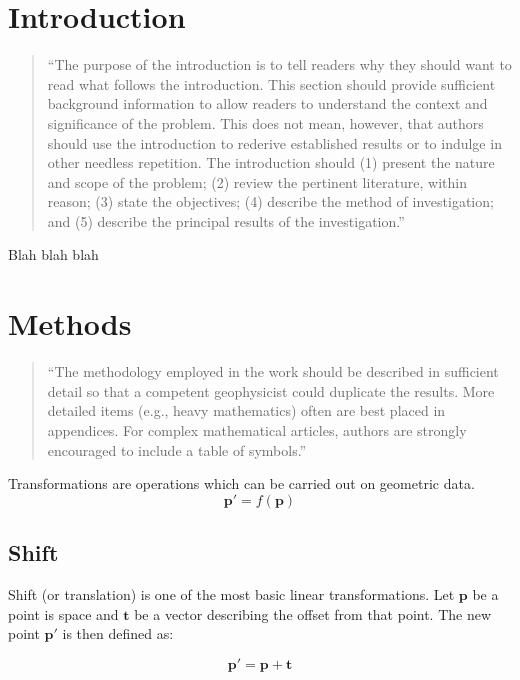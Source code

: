 \documentclass[]{report}   %
\begin{document}
\chapter{Introduction}		%


\begin{quotation}
	``The purpose of the introduction is to tell readers why they should want to read what follows the introduction.
	This section should provide sufficient background information to allow readers to understand the context and
	significance of the problem. This does not mean, however, that authors should use the introduction to rederive
	established results or to indulge in other needless repetition. The introduction should (1) present the nature
	and scope of the problem; (2) review the pertinent literature, within reason; (3) state the objectives; (4)
	describe the method of investigation; and (5) describe the principal results of the investigation.''
\end{quotation}


Blah blah blah





\chapter{Methods}           %

\begin{quotation}
	``The methodology employed in the work should be described in sufficient detail so that a competent geophysicist
	could duplicate the results. More detailed items (e.g., heavy mathematics) often are best placed in appendices.
	For complex mathematical articles, authors are strongly encouraged to include a table of symbols.''
\end{quotation}

Transformations are operations which can be carried out on geometric data. 
\[
	\mathbf{p\prime} = f(\mathbf{p})
\]



\section{Shift}

Shift (or translation) is one of the most basic linear transformations. Let \(\mathbf{p}\) be a point is space and \(\mathbf{t}\) be a vector describing the offset from that point. The new point \(\mathbf{p\prime}\) is then defined as:
\begin{mdframed}
\[
	\mathbf{p\prime} = \mathbf{p} + \mathbf{t}
\]
\end{mdframed}
\end{document}
